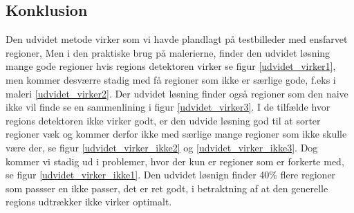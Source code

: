 \subsection{Konklusion}
Den udvidet metode virker som vi havde plandlagt på testbilleder med
ensfarvet regioner, Men i den praktiske brug på malerierne, finder den
udvidet løsning mange gode regioner hvis regions detektoren virker se
figur \ref{udvidet_virker1}, men kommer desværre stadig med få regioner
som ikke er særlige gode, f.eks i maleri \ref{udvidet_virker2}. Der
udvidet løsning finder også regioner som den naive ikke vil finde se en
sammenlining i figur \ref{udvidet_virker3}. I de tilfælde hvor regions
detektoren ikke virker godt, er den udvide løsning god til at sorter
regioner væk og kommer derfor ikke med særlige mange regioner som ikke
skulle være der, se figur \ref{udvidet_virker_ikke2} og
\ref{udvidet_virker_ikke3}. Dog kommer vi stadig ud i problemer, hvor
der kun er regioner som er forkerte med, se figur
\ref{udvidet_virker_ikke1}. Den udvidet løsnign finder 40\% flere
regioner som passser en ikke passer, det er ret godt, i betraktning af
at den generelle regions udtrækker ikke virker optimalt.
